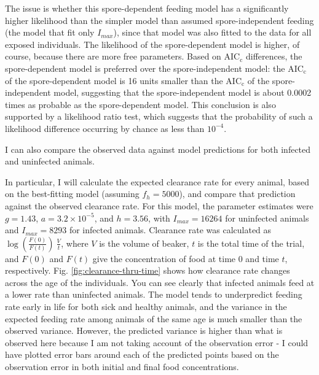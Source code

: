 \documentclass[12pt,reqno,final,pdftex]{amsart}\usepackage[]{graphicx}\usepackage[]{color}
\theoremstyle{plain}
\numberwithin{equation}{part}
\begin{document}
The issue is whether this spore-dependent feeding model has a significantly higher likelihood than the simpler model than assumed spore-independent feeding (the model that fit only $I_{max}$), since that model was also fitted to the data for all exposed individuals.
The likelihood of the spore-dependent model is higher, of course, because there are more free parameters.
Based on AIC$_{\text{c}}$ differences, the spore-dependent model is preferred over the spore-independent model: the AIC$_{\text{c}}$ of the spore-dependent model is 16 units smaller than the AIC$_{\text{c}}$ of the spore-independent model, suggesting that the spore-independent model is about 0.0002 times as probable as the spore-dependent model.
This conclusion is also supported by a likelihood ratio test, which suggests that the probability of such a likelihood difference occurring by chance as less than $10^{-4}$.



I can also compare the observed data against model predictions for both infected and uninfected animals.

In particular, I will calculate the expected clearance rate for every animal, based on the best-fitting model (assuming $f_h = 5000$), and compare that prediction against the observed clearance rate.
For this model, the parameter estimates were $g=1.43$, $a=3.2\times10^{-5}$, and $h=3.56$, with $I_{max}=16264$ for uninfected animals and $I_{max}=8293$ for infected animals.
Clearance rate was calculated as $\log\left(\frac{F(0)}{F(t)}\right)~\frac{V}{t}$, where $V$ is the volume of beaker, $t$ is the total time of the trial, and $F(0)$ and $F(t)$ give the concentration of food at time 0 and time $t$, respectively.
Fig. \ref{fig:clearance-thru-time} shows how clearance rate changes across the age of the individuals.
You can see clearly that infected animals feed at a lower rate than uninfected animals.
The model tends to underpredict feeding rate early in life for both sick and healthy animals, and the variance in the expected feeding rate among animals of the same age is much smaller than the observed variance.
However, the predicted variance is higher than what is observed here because I am not taking account of the observation error - I could have plotted error bars around each of the predicted points based on the observation error in both initial and final food concentrations.
\end{document}
